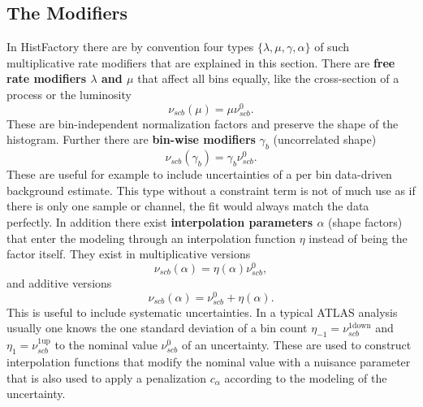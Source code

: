 \subsection{The Modifiers}\label{sec:modifiers}
In HistFactory there are by convention four types $\{\lambda,\mu,\gamma,\alpha\}$ of such multiplicative rate modifiers that are explained in this section. There are \textbf{free rate modifiers $\lambda$ and $\mu$} that affect all bins equally, like the cross-section of a process or the luminosity 
\begin{equation}
    \nu_{scb}(\mu)=\mu \nu_{scb}^0.
\end{equation}
These are bin-independent normalization factors and preserve the shape of the histogram. 
Further there are \textbf{bin-wise modifiers} $\gamma_b$ (uncorrelated shape)
\begin{equation}
    \nu_{scb}(\gamma_b)=\gamma_b \nu_{scb}^0.
\end{equation}
These are useful for example to include uncertainties of a per bin data-driven background estimate. This type without a constraint term is not of much use as if there is only one sample or channel, the fit would always match the data perfectly.
In addition there exist \textbf{interpolation parameters $\alpha$} (shape factors) that enter the modeling through an interpolation function $\eta$ instead of being the factor itself. They exist in multiplicative versions 
\begin{equation}
    \nu_{scb}(\alpha)=\eta(\alpha) \nu_{scb}^0,
\end{equation}
and additive versions
\begin{equation}
    \nu_{scb}(\alpha)=\nu_{scb}^0 + \eta(\alpha).
\end{equation}
This is useful to include systematic uncertainties. In a typical ATLAS analysis usually one knows the one standard deviation of a bin count $\eta_{-1}=\nu_{scb}^\mathrm{1down}$ and $\eta_{1}=\nu_{scb}^\mathrm{1up}$ to the nominal value $\nu_{scb}^0$ of an uncertainty. These are used to construct interpolation functions that modify the nominal value with a nuisance parameter that is also used to apply a penalization $c_\alpha$ according to the modeling of the uncertainty.

